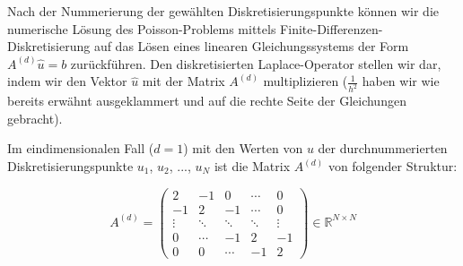\documentclass{scrartcl}
\newcommand{\R}{\mathbb{R}}
\begin{document}
%
%
%

Nach der Nummerierung der gewählten Diskretisierungspunkte können wir die numerische Lösung des Poisson-Problems mittels Finite-Differenzen-Diskretisierung auf das Lösen eines linearen Gleichungssystems der Form $A^{(d)}\hat{u}=b$ zurückführen.
Den diskretisierten Laplace-Operator stellen wir dar, indem wir den Vektor $\hat{u}$ mit der Matrix $A^{(d)}$ multiplizieren ($\frac{1}{h^2}$ haben wir wie bereits erwähnt ausgeklammert und auf die rechte Seite der Gleichungen gebracht).

Im eindimensionalen Fall ($d=1$) mit den Werten von $u$ der durchnummerierten Diskretisierungspunkte $u_1$, $u_2$, ..., $u_N$ ist die Matrix $A^{(d)}$ von folgender Struktur:

\[A^{(d)}=
\begin{pmatrix}
   2 & -1 &  0 & \cdots & 0 \\
  -1 &  2 & -1 & \cdots & 0 \\
   \vdots & \ddots & \ddots & \ddots & \vdots \\
   0 & \cdots & -1 &  2 & -1 \\
   0 & 0 & \cdots & -1 &  2
\end{pmatrix}
\in\R^{N\times N}
\]
\end{document}
